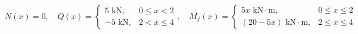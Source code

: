 \begin{equation}

    N(x) = 0, \quad

    Q(x) = \begin{cases}

        5\text{ kN},  & 0 \leq x < 2 \\

        -5\text{ kN}, & 2 < x \leq 4

    \end{cases}, \quad

    M_f(x) = \begin{cases}

        5x\text{ kN}\cdot\text{m},        & 0 \leq x \leq 2 \\

        (20 - 5x)\text{ kN}\cdot\text{m}, & 2 \leq x \leq 4

    \end{cases}

\end{equation}



